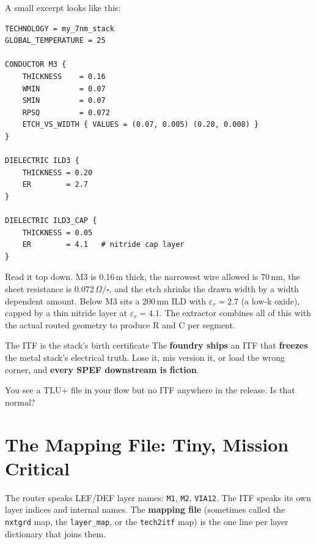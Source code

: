 A small excerpt looks like this:

\begin{lstlisting}[style=eda,caption={ITF excerpt for a 7nm-ish stack.}]
TECHNOLOGY = my_7nm_stack
GLOBAL_TEMPERATURE = 25

CONDUCTOR M3 {
    THICKNESS    = 0.16
    WMIN         = 0.07
    SMIN         = 0.07
    RPSQ         = 0.072
    ETCH_VS_WIDTH { VALUES = (0.07, 0.005) (0.20, 0.008) }
}

DIELECTRIC ILD3 {
    THICKNESS = 0.20
    ER        = 2.7
}

DIELECTRIC ILD3_CAP {
    THICKNESS = 0.05
    ER        = 4.1   # nitride cap layer
}
\end{lstlisting}

Read it top down. M3 is 0.16\,\textmu m thick, the narrowest wire allowed is 70\,nm, the sheet resistance is 0.072\,$\Omega/\square$, and the etch shrinks the drawn width by a width dependent amount. Below M3 sits a 200\,nm ILD with $\varepsilon_r = 2.7$ (a low-k oxide), capped by a thin nitride layer at $\varepsilon_r = 4.1$. The extractor combines all of this with the actual routed geometry to produce R and C per segment.

\begin{hook}{The ITF is the stack's birth certificate}
The \textbf{foundry ships} an ITF that \textbf{freezes} the metal stack's electrical truth. Lose it, mis version it, or load the wrong corner, and \textbf{every SPEF downstream is fiction}.
\end{hook}

\begin{gut}
You see a TLU+ file in your flow but no ITF anywhere in the release. Is that normal? 
\end{gut}

\section{The Mapping File: Tiny, Mission Critical}

The router speaks LEF/DEF layer names: \texttt{M1}, \texttt{M2}, \texttt{VIA12}. The ITF speaks its own layer indices and internal names. The \textbf{mapping file} (sometimes called the \texttt{nxtgrd} map, the \texttt{layer\_map}, or the \texttt{tech2itf} map) is the one line per layer dictionary that joins them.

